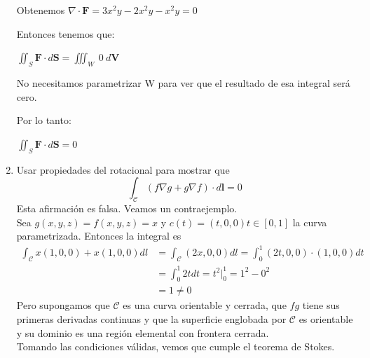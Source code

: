 \documentclass{article}
\begin{document}
\begin{enumerate}
{            Obtenemos $\nabla \cdot \mathbf{F} = 3x^2y - 2x^2y - x^2y = 0$

            Entonces tenemos que:

             $\iint_{S} \mathbf{F} \cdot d\mathbf{S} = \iiint_{W} \ 0 \  d\mathbf{V}$

            No necesitamos parametrizar W para ver que el resultado de esa integral será cero.

            Por lo tanto:

            $\iint_{S} \mathbf{F} \cdot d\mathbf{S} = 0$



        }

        \item {
            Usar propiedades del rotacional para mostrar que
            \[
                \int_{\mathcal{C}} {{\left(f \nabla g + g \nabla f\right)} \cdot d\mathbf{l}} = 0
            \]
            \color{azul}
            Esta afirmación es falsa. Veamos un contraejemplo.\\
            Sea $g(x, y, z) = f(x, y, z) = x$ y $c(t) = (t, 0, 0) t\in [0, 1]$ la
            curva parametrizada.
            Entonces la integral es
            \begin{align*}
                \int_{\mathcal{C}}{x(1, 0, 0) + x(1, 0, 0)dl} &= \int_{\mathcal{C}}{(2x, 0, 0)dl}
                = \int_{0}^{1}{(2t, 0, 0)\cdot (1, 0, 0)dt} \\
                &= \int_{0}^{1}{2tdt}  = t^{2} \Big |_{0}^{1} = 1^{2} - 0^{2} \\
                &= 1 \neq 0
            \end{align*}
            Pero supongamos que $\mathcal{C}$ es una curva orientable y cerrada,
            que $fg$ tiene sus primeras derivadas continuas y que la
            superficie englobada por $\mathcal{C}$ es orientable y su dominio es
            una región elemental con frontera cerrada.\\
            Tomando las condiciones válidas, vemos que cumple el teorema de Stokes.

}
\end{enumerate}
\end{document}
